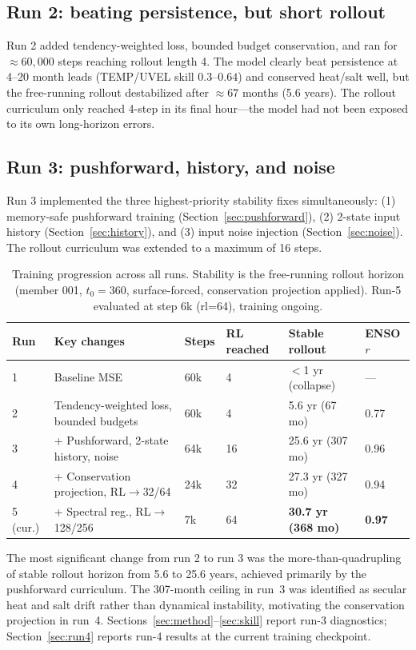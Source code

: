 \documentclass[11pt]{article}
\begin{document}
\subsection{Run 2: beating persistence, but short rollout}
Run 2 added tendency-weighted loss, bounded budget conservation, and ran for
$\approx60{,}000$ steps reaching rollout length 4. The model clearly beat
persistence at 4--20 month leads (TEMP/UVEL skill $0.3$--$0.64$) and conserved
heat/salt well, but the free-running rollout destabilized after $\approx67$
months (5.6 years). The rollout curriculum only reached 4-step in its final
hour---the model had not been exposed to its own long-horizon errors.

\subsection{Run 3: pushforward, history, and noise}
\label{sec:run3train}
Run 3 implemented the three highest-priority stability fixes simultaneously:
(1) memory-safe pushforward training (Section~\ref{sec:pushforward}),
(2) 2-state input history (Section~\ref{sec:history}), and
(3) input noise injection (Section~\ref{sec:noise}).
The rollout curriculum was extended to a maximum of 16 steps.

\begin{table}[h]
\centering
\caption{Training progression across all runs. Stability is the free-running
rollout horizon (member 001, $t_0=360$, surface-forced, conservation projection applied).
Run-5 evaluated at step 6k (rl=64), training ongoing.}
\label{tab:runhistory}
\begin{tabular}{llllll}
\toprule
Run & Key changes & Steps & RL reached & Stable rollout & ENSO $r$ \\
\midrule
1 & Baseline MSE & 60k & 4 & $<$1 yr (collapse) & --- \\
2 & Tendency-weighted loss, bounded budgets & 60k & 4 & 5.6 yr (67 mo) & 0.77 \\
3 & + Pushforward, 2-state history, noise & 64k & 16 & 25.6 yr (307 mo) & 0.96 \\
4 & + Conservation projection, RL$\to$32/64 & 24k & 32 & 27.3 yr (327 mo) & 0.94 \\
5 (cur.) & + Spectral reg., RL$\to$128/256 & 7k & 64 & \textbf{30.7 yr (368 mo)} & \textbf{0.97} \\
\bottomrule
\end{tabular}
\end{table}

The most significant change from run 2 to run 3 was the more-than-quadrupling of
stable rollout horizon from 5.6 to 25.6 years, achieved primarily by the
pushforward curriculum. The 307-month ceiling in run~3 was identified as secular
heat and salt drift rather than dynamical instability, motivating the conservation
projection in run~4. Sections~\ref{sec:method}--\ref{sec:skill} report
run-3 diagnostics; Section~\ref{sec:run4} reports run-4 results at the current
training checkpoint.
\end{document}

